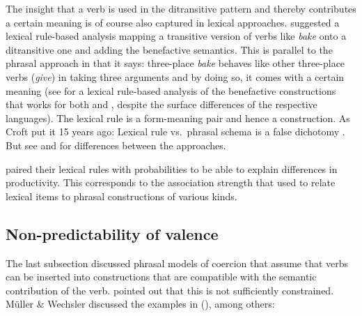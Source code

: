 \documentclass[output=paper
	        ,collection
	        ,collectionchapter
 	        ,biblatex
                ,babelshorthands
                ,newtxmath
                ,draftmode
                ,colorlinks, citecolor=brown
]{langscibook}
\begin{document}
The insight that a verb is used in the ditransitive pattern and thereby contributes a certain
meaning is of course also captured in lexical approaches. \citet{BC99a} suggested a lexical
rule-based analysis mapping a transitive version of verbs like \emph{bake} onto a ditransitive one
and adding the benefactive semantics. This is parallel to the phrasal approach in that it says:
three-place \emph{bake} behaves like other three-place verbs (\eg \emph{give}) in taking three
arguments and by doing so, it comes with a certain meaning (see \citealt{MuellerLFGphrasal} for a
lexical rule-based analysis of the benefactive constructions that works for both  and ,
despite the surface differences of the respective languages). The lexical rule is a form-meaning pair
and hence a construction. As Croft put it 15 years ago: Lexical rule vs.\ phrasal schema is a false
dichotomy \citep{Croft2003a}. But see  and  for
differences between the approaches.

\citet{BC99a} paired their lexical rules with probabilities to be able to explain differences in
productivity. This corresponds to the association strength that \citet[]{vanTrijp2011a} used to relate
lexical items to phrasal constructions of various kinds.

\subsection{Non-predictability of valence}

The last subsection discussed phrasal models of coercion that assume that verbs can be inserted
into constructions that are compatible with the semantic contribution of the verb. \citet[Section~7.4]{MWArgSt}
pointed out that this is not sufficiently constrained. Müller \& Wechsler discussed the examples in
(), among others:
\end{document}
